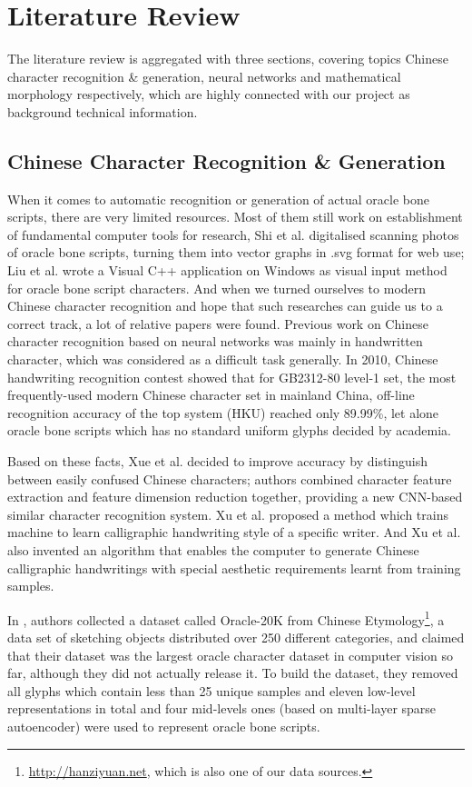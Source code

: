 \chapter{Literature Review}
The literature review is aggregated with three sections, covering topics Chinese character recognition \& generation, neural networks and mathematical morphology respectively, which are highly connected with our project as background technical information.

\section{Chinese Character Recognition \& Generation}
When it comes to automatic recognition or generation of actual oracle bone scripts, there are very limited resources. Most of them still work on establishment of fundamental computer tools for research, Shi et al.\cite{Shi2005} digitalised scanning photos of oracle bone scripts, turning them into vector graphs in .svg format for web use; Liu et al.\cite{Liu2004} wrote a Visual C++ application on Windows as visual input method for oracle bone script characters. And when we turned ourselves to modern Chinese character recognition and hope that such researches can guide us to a correct track, a lot of relative papers were found. Previous work on Chinese character recognition based on neural networks was mainly in handwritten character, which was considered as a difficult task generally. In 2010, Chinese handwriting recognition contest\cite{5659229} showed that for GB2312-80 level-1 set, the most frequently-used modern Chinese character set in mainland China, off-line recognition accuracy of the top system (HKU) reached only 89.99\%, let alone oracle bone scripts which has no standard uniform glyphs decided by academia.

Based on these facts, Xue et al.\cite{xue2014recognition} decided to improve accuracy by distinguish between easily confused Chinese characters; authors combined character feature extraction and feature dimension reduction together, providing a new CNN-based similar character recognition system. Xu et al.\cite{xu2008automatic} proposed a method which trains machine to learn calligraphic handwriting style of a specific writer. And Xu et al.\cite{1439477} also invented an algorithm that enables the computer to generate Chinese calligraphic handwritings with special aesthetic requirements learnt from training samples.

In \cite{7327196}, authors collected a dataset called Oracle-20K from Chinese Etymology\footnote{\url{http://hanziyuan.net}, which is also one of our data sources.}, a data set of sketching objects distributed over 250 different categories, and claimed that their dataset was the largest oracle character dataset in computer vision so far, although they did not actually release it. To build the dataset, they removed all glyphs which contain less than 25 unique samples and eleven low-level representations in total and four mid-levels ones (based on multi-layer sparse autoencoder) were used to represent oracle bone scripts.

